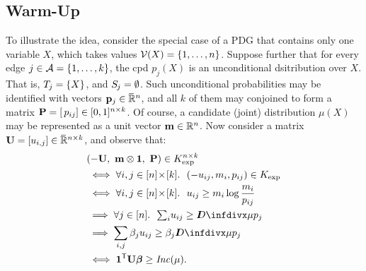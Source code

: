 \documentclass[twoside]{article}
\begin{document}
\subsection{Warm-Up}\label{sec:illust}

To illustrate the idea, consider the special case of a PDG that
contains only one variable $X$, which takes values $\mathcal V(X) = \{1,
\ldots, n\}$.  
Suppose further that for every edge $j \in \mathcal A = \{1, \ldots, k\}$, the cpd $p_j(X)$ is an unconditional dsitribution over $X$.
That is, $\Tgt j = \{ X \}$, and $\Src j = \emptyset$.
Such unconditional probabilities may be identified with vectors $\mathbf{p}_j \in \mskip1mu\overline{\mskip-1mu\mathbb R\!}\,^n$, and all $k$ of them may conjoined to form a 
matrix $\mathbf{P} = [\,p_{ij}] \in [0,1]^{n \times k}$.
Of course, a candidate (joint) distribution $\mu(X)$
may be represented as a unit vector $\mathbf{m} \in \mathbb R^n$. 
%
Now consider a matrix $\mathbf{U} = [u_{i,j}] \in \mskip1mu\overline{\mskip-1mu\mathbb R\!}\,^{n \times k}$,
and observe that:
\begin{align*}
  &(- \mat U,~ \mat m \otimes \mat 1,~ \mat P) \in K_{\exp}^{n \times k} \\
    &\iff \forall  i,j \in [n]\!\times\![k].~~ 
        (- u_{ij}, m_{i}, p_{ij}) \in K_{\exp} \\
    &\iff \forall  i,j \in [n]\!\times\![k].~~ 
            u_{ij} \ge m_i \log \frac{m_i}{p_{ij}} \\
    &\implies \forall j \in [n].~~  {\textstyle\sum_i} u_{ij}  \ge \kldiv{\mu}{p_j} \\
    &\implies \sum_{i,j} \beta_j u_{ij}  \ge \beta_j \kldiv{\mu}{p_j} \\
    &\iff \mat 1^{\sf T} \mat U \bbeta \ge \Inc(\mu)
    .
\end{align*}
\end{document}

